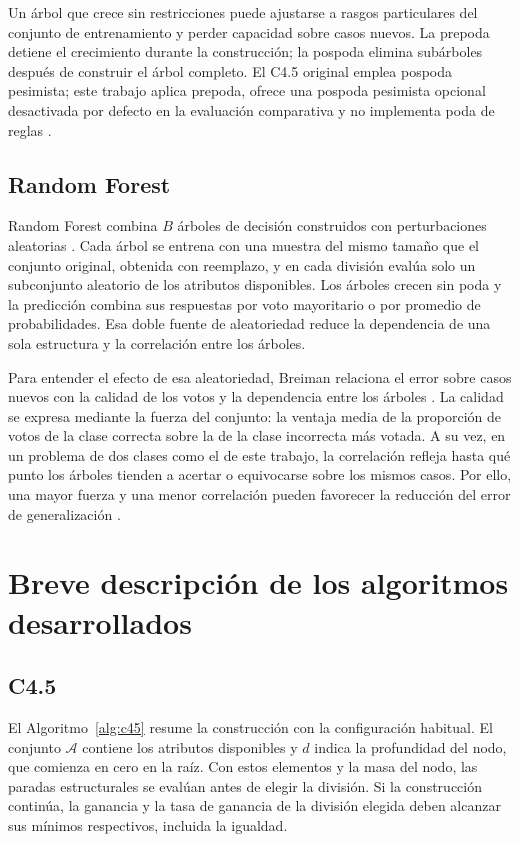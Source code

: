 \documentclass[runningheads]{llncs}
\begin{document}
Un árbol que crece sin restricciones puede ajustarse a rasgos particulares del conjunto de entrenamiento y perder capacidad sobre casos nuevos. La prepoda detiene el crecimiento durante la construcción; la pospoda elimina subárboles después de construir el árbol completo. El C4.5 original emplea pospoda pesimista; este trabajo aplica prepoda, ofrece una pospoda pesimista opcional desactivada por defecto en la evaluación comparativa y no implementa poda de reglas \cite{liu2011}.

\subsection{Random Forest}

Random Forest combina $B$ árboles de decisión construidos con perturbaciones aleatorias \cite{breiman2001}. Cada árbol se entrena con una muestra del mismo tamaño que el conjunto original, obtenida con reemplazo, y en cada división evalúa solo un subconjunto aleatorio de los atributos disponibles. Los árboles crecen sin poda y la predicción combina sus respuestas por voto mayoritario o por promedio de probabilidades. Esa doble fuente de aleatoriedad reduce la dependencia de una sola estructura y la correlación entre los árboles.

Para entender el efecto de esa aleatoriedad, Breiman relaciona el error sobre casos nuevos con la calidad de los votos y la dependencia entre los árboles \cite{breiman2001}. La calidad se expresa mediante la fuerza del conjunto: la ventaja media de la proporción de votos de la clase correcta sobre la de la clase incorrecta más votada. A su vez, en un problema de dos clases como el de este trabajo, la correlación refleja hasta qué punto los árboles tienden a acertar o equivocarse sobre los mismos casos. Por ello, una mayor fuerza y una menor correlación pueden favorecer la reducción del error de generalización \cite{breiman2001}.

\section{Breve descripción de los algoritmos desarrollados}

\subsection{C4.5}

El Algoritmo~\ref{alg:c45} resume la construcción con la configuración habitual. El conjunto $\mathcal{A}$ contiene los atributos disponibles y $d$ indica la profundidad del nodo, que comienza en cero en la raíz. Con estos elementos y la masa del nodo, las paradas estructurales se evalúan antes de elegir la división. Si la construcción continúa, la ganancia y la tasa de ganancia de la división elegida deben alcanzar sus mínimos respectivos, incluida la igualdad.
\end{document}
